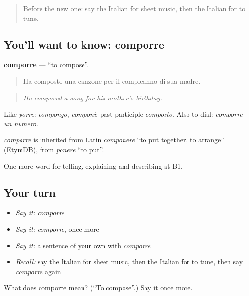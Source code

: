 \label{lesson:IT-C517-comporre}



\begin{quote}
Before the new one: say the Italian for sheet music, then the Italian for to tune.
\end{quote}

\subsection*{You'll want to know: comporre}
\textbf{comporre} — \textquotedblleft{}to compose\textquotedblright{}.

\begin{quote}
Ha composto una canzone per il compleanno di sua madre.
\end{quote}

\begin{quote}
\emph{He composed a song for his mother's birthday.}
\end{quote}

Like \emph{porre}: \emph{compongo}, \emph{componi}; past participle \emph{composto}. Also to dial: \emph{comporre un numero}.

\begin{cousinweb}
\emph{comporre} is inherited from Latin \emph{compōnere} \textquotedblleft{}to put together, to arrange\textquotedblright{} (EtymDB), from \emph{pōnere} \textquotedblleft{}to put\textquotedblright{}.
\end{cousinweb}

\begin{grammarlens}[title={What you've built}]
One more word for telling, explaining and describing at B1.
\end{grammarlens}

\subsection*{Your turn}
\begin{itemize}
\raggedright
  \item \emph{Say it:} \emph{comporre}
  \item \emph{Say it:} \emph{comporre}, once more
  \item \emph{Say it:} a sentence of your own with \emph{comporre}
  \item \emph{Recall:} say the Italian for sheet music, then the Italian for to tune, then say \emph{comporre} again
\end{itemize}

\begin{tcolorbox}[breakable,colback=teal!4,colframe=teal!35!black,title={Before you move on}]
What does comporre mean? (\textquotedblleft{}To compose\textquotedblright{}.) Say it once more.
\end{tcolorbox}
